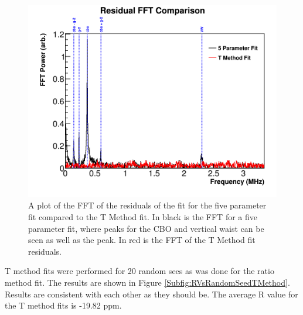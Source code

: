 	\begin{figure}[]
		\centering
		\includegraphics[width=\textwidth]{FFTComparison_TMethod}
	    \caption[FFTComparison_TMethod]{A plot of the FFT of the residuals of the fit for the five parameter fit compared to the T Method fit. In black is the FFT for a five parameter fit, where peaks for the CBO and vertical waist can be seen as well as the \gmtwo peak. In red is the FFT of the T Method fit residuals.}
	    \label{fig:FFTComparison_TMethod}
	\end{figure}

\clearpage

	T method fits were performed for 20 random sees as was done for the ratio method fit. The results are shown in Figure \ref{Subfig:RVsRandomSeedTMethod}. Results are consistent with each other as they should be. The average R value for the T method fits is -19.82 ppm.

